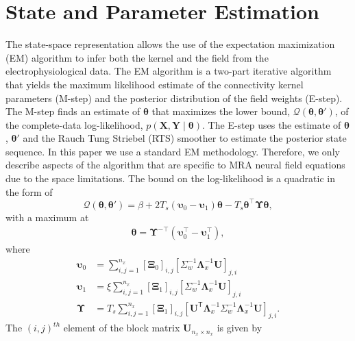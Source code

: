 \documentclass[journal,a4paper]{IEEEtran}
\begin{document}
\section{State and Parameter Estimation}
The state-space representation allows the use of the expectation maximization (EM) algorithm \cite{Dempster1977,Shumway2000} to infer both the kernel and the field from the electrophysiological data. The EM algorithm is a two-part iterative algorithm that yields the maximum likelihood estimate of the connectivity kernel parameters (M-step) and the posterior distribution of the field weights (E-step). The M-step finds an estimate of $\boldsymbol\theta$ that maximizes the lower bound, $\mathcal{Q}\left(\boldsymbol\theta,\boldsymbol\theta'\right)$, of the complete-data log-likelihood,  $p\left(\mathbf{X},\mathbf{Y} \mid \boldsymbol\theta \right)$. The E-step uses the estimate of $\boldsymbol\theta$, $\boldsymbol\theta'$ and the Rauch Tung Striebel (RTS) smoother \cite{Gibsona2005} to estimate the posterior state sequence. In this paper we use a standard EM methodology. Therefore, we only describe aspects of the algorithm that are specific to MRA neural field equations due to the space limitations. The bound on the log-likelihood is a quadratic in the form of
\begin{equation}
 \mathcal Q\left(\boldsymbol \theta,\boldsymbol\theta'\right)=\beta+2T_s\left(\boldsymbol\upsilon_0-\boldsymbol\upsilon_1\right)\boldsymbol\theta-T_s\boldsymbol\theta^\top\boldsymbol\Upsilon\boldsymbol\theta,
\end{equation}
with a maximum at
\begin{align}
 \boldsymbol \theta= \boldsymbol\Upsilon^{-\top}(\boldsymbol\upsilon_0^\top-\boldsymbol\upsilon_1^\top),
\end{align}
where
\begin{align}\label{eq:upsilon0}
 \boldsymbol\upsilon_0&=\sum_{i,j=1}^{n_x}[\boldsymbol\Xi_0]_{i,j}[\Sigma_{w}^{-1}\boldsymbol\Lambda_{x}^{-1}\mathbf U]_{j,i}\\ 
 \boldsymbol\upsilon_1&=\xi\sum_{i,j=1}^{n_x}[\boldsymbol\Xi_1]_{i,j}[\Sigma_{w}^{-1}\boldsymbol\Lambda_{x}^{-1}\mathbf U]_{j,i}\label{eq:upsilon1} \\
 \boldsymbol\Upsilon&=T_s\sum_{i,j=1}^{n_x}[\boldsymbol\Xi_1]_{i,j}[\mathbf{U}^{\mathsf T} \boldsymbol\Lambda_{x}^{-1}\Sigma_{w}^{-1}\boldsymbol\Lambda_{x}^{-1}\mathbf{U}]_{j,i}\label{eq:Upsilon}.
\end{align}
The $\left(i,j\right)^{th}$ element of the block matrix $\mathbf U_{n_x \times n_x}$ is given by
\end{document}
